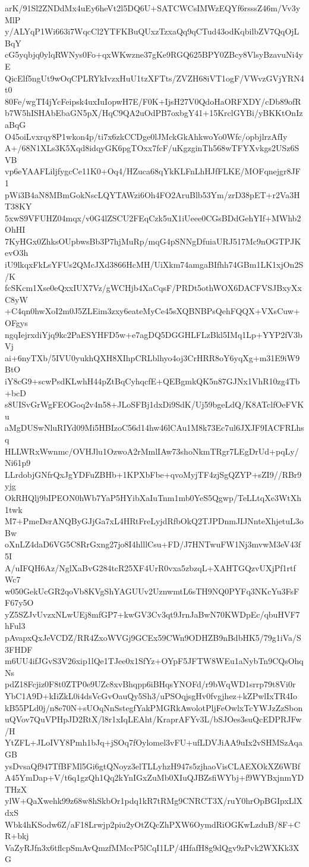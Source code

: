 arK/91Sl2ZNDdMx4uEy6heVt2l5DQ6U+SATCWCsIMWzEQYf6rsssZ46m/Vv3yMlP
y/ALYqP1Wi663i7WqcCl2YTFKBuQUxzTzxaQq9qCTud43odKqbilbZV7QqOjLBqY
cG5yqbjq0ylqRWNys0Fo+qxWKwzne37gKe9RGQ625BPY0ZBcy8VlsyBzavuNi4yE
QicElf5ngUt9wOqCPLRYkIvzxHuU1tzXFTts/ZVZH68iVT1ogF/VWvzGVjYRN4t0
80Fe/wgTI4jYcFeipsk4uxIuIopwH7E/F0K+IjsH27V0QdoHaORFXDY/cDb89ofR
b7W5hISHAbEbaGN5pX/HqC9QA2uOdPB7oxbgY41+15KrclGYBi/yBKKtOnIzaBqG
O45oiLvxrqy8P1wkon4p/ti7x6zkCCDge0lJMckGkAhkwoYo0Wfc/opbjlrzAfIy
A+/68N1XLs3K5Xqd8idqyGK6pgTOxx7fcF/uKgzginTh568wTFYXvkgs2USz6SVB
vp6eYAAFLiljfygcCe11K0+Oq4/HZuca68qYkKLFnLhHJfFLKE/MOFqnejgr8JF1
pWi3B4aN8MBmGokNscLQYTAWzi6Oh4FO2AruBlb53Ym/zrD38pET+r2Va3HT38KY
5xwS9VFUHZ04mqx/v0G4lZSCU2FEqCzk5uX1iUeee0CGsBDdGehYIf+MWhb2OhHI
7KyHGx0ZhksOUpbwsBb3P7hjMuRp/mqG4pSNNgDfuiaURJ517Mc9nOGTPJKevO3h
iU9lkqxFkLsYFUs2QMcJXd3866HcMH/UiXkm74amgaBIfhh74GBm1LK1xjOn2S/K
fcSKcm1Xse0eQxxIUX7Vz/gWCHjb4XaCqsF/PRDt5othWOX6DACFVSJBxyXxC8yW
+C4qn0hwXoI2m0J5ZLEim3zxy6eateMyCe45sXQBNBPsQehFQQX+VXsCuw+OFgys
ngqIejrxdiYjq9kc2PaESYHFD5w+e7agDQ5DGGHLFLzBkl5IMq1Lp+YYP2fV3bVj
ai+6nyTXb/5IVU0yukhQXH8XIhpCRLblhyo4oj3CrHRR8oY6yqXg+m31E9iW9BtO
iY8cG9+scwPsdKLwhH44pZtBqCyhqcfE+QEBgmkQK5n87GJNx1VhR10zg4Tb+bcD
s8UISvGrWgFEOGoq2v4n58+JLoSFBj1dxDi9SdK/Uj59bgeLdQ/K8ATclfOeFVKu
aMgDUSwNluRIYd09Mi5HBIzoC56d14hw46lCAu1M8k73Ec7ul6JXJF9IACFRLhsq
HLLWRxWwnmc/OVHJlu1OzwoA2rMmlIAw73shoNkmTRgr7LEgDrUd+pqLy/Ni61p9
LLrdobjGNfrQxJgYDFuZBHb+1KPXbFbe+qvoMyjTF4zjSgQZYP+sZI9//RBr9yjg
OkRHQlj9bIPEON0hWb7YaP5HYibXaIuTnm1mb0YeS5Qgwp/TeLLtqXe3WtXh1twk
M7+PmeDsrANQByGJjGa7xL4HRtFreLyjdRfbOkQ2TJPDnmJIJNnteXhjetuL3oBw
oXnLZ4daD6VG5C8RrGxng27jo8I4hlllCsu+FD/J7HNTwuFW1Nj3mvwM3eV43f5I
A/uIFQH6Az/NglXaBvG284tcR25XF4UrR0vxa5zbzqL+XAHTGQzvUXjPf1rtfWc7
w050GekUcGR2qoVb8KVgShYAGUUv2UznwmtL6sTH9NQ0PYFq3NKcYu3FsFF67y5O
yZ5SZJvUvzxNLwUEj8mfGP7+kwGV3Cv3qt9JrnJaBwN70KWDpEc/qbuHVF7hFul3
pAvapxQxJeVCDZ/RR4ZxoWVGj9GCEx59CWn9ODHZB9nBdbHK5/79g1iVa/S3FHDF
m6UU4ifJGvS3V26xip1lQe1TJee0x1SfYz+OYpF5JFTW8WEu1aNybTn9CQsOhqNs
pdZ18Fcjiz0F8t0ZTP0e9UZc8xvBhqpp6iBHqsYNOFd/r9bWqWD1srrp79t8Vi0r
YbC1A9D+kIiZkL0i4dsVcGvOauQy5Sh3/uPSOqjsgHv0fvgjhez+kZPwlIxTR4Io
kB55PLd0j/n8e70N+sUOqNnSstegfYakPMGRkAwolotPljFeOwlxTcYWJzZzSbon
uQVov7QuVPHpJD2RtX/l8r1xIqLEAht/KraprAFYv3L/bSJOes3suQcEDPRJFw/H
YtZFL+JLoIVY8Pmh1bJq+jSOq7fOylomel3vFU+ufLDVJiAA9uIx2vSHMSzAqaGB
ysDvsaQf947TfBFMl5Gi6gtQNoyz3elTLLyhzH947s5zjhaoVisCLAEXOkXZ6WBf
A45YmDap+V/t6q1gzQh1Qq2kYnIGxZuMb0XIuQJBZsfiWYbj+f9WYBxjnmYDTHzX
ylW+QaXwehk99z68w8hSkbOr1pdq1kR7tRMg9CNRCT3X/ruY0hrOpBGIpxLlXdxS
Wbk4hKSodw6Z/aF18Lrwjp2piu2yOtZQcZhPXW6OymdRiOGKwLzduB/8F+CR+bkj
VaZyRJfn3x6tflcpSmAvQmzfMMccP5lCqI1LP/4HfafH8g9dQgv9zPvk2WXKk3XG
